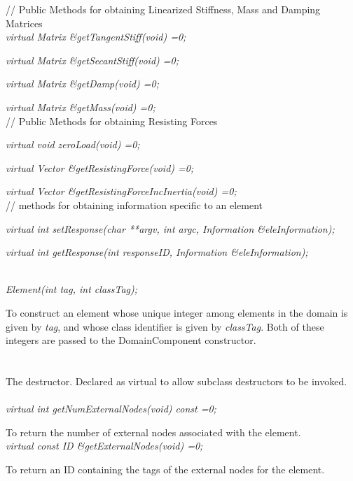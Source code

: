 \indent // Public Methods for obtaining Linearized Stiffness,
Mass and Damping Matrices\\
{\em virtual Matrix \&getTangentStiff(void) =0;} 

{\em virtual Matrix \&getSecantStiff(void) =0;} 

{\em virtual Matrix \&getDamp(void) =0;} 

{\em virtual Matrix \&getMass(void) =0;} \\ 

// Public Methods for obtaining Resisting Forces 

{\em virtual void zeroLoad(void) =0;	}

{\em virtual Vector \&getResistingForce(void) =0;} 

{\em virtual Vector \&getResistingForceIncInertia(void) =0;} \\ 

// methods for obtaining information specific to an element 

{\em virtual int setResponse(char **argv, int argc, Information \&eleInformation);}

{\em virtual int getResponse(int responseID, Information \&eleInformation);}


  \\
{\em Element(int tag, int classTag);}  

To construct an element whose unique integer among elements in the
domain is given by {\em tag}, and whose class identifier is given
by {\em classTag}. Both of these integers are passed to the
DomainComponent constructor. \\

 \\
\\ 
The destructor. Declared as virtual to allow subclass destructors to
be invoked. \\

  \\
{\em virtual int getNumExternalNodes(void) const =0;} 

To return the number of external nodes associated with the element. \\

{\em virtual const ID \&getExternalNodes(void) =0;} 

To return an ID containing the tags of the external nodes for the element. \\

